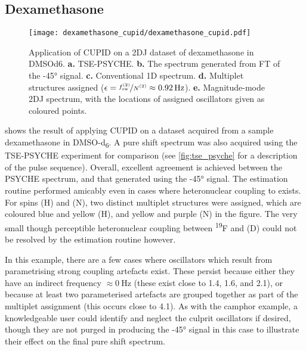 \subsection{Dexamethasone}
\begin{sidewaysfigure}%
    \centering%
    \texttt{[image: dexamethasone\_cupid/dexamethasone\_cupid.pdf]}%
    \caption[
        Application of \acs{CUPID} on a dexamethasone dataset.
    ]{
        Application of \acs{CUPID} on a \ac{2DJ} dataset of dexamethasone in
        \acs{DMSOd6}.
        \textbf{a.} \acs{TSE-PSYCHE}.
        \textbf{b.} The spectrum generated from \ac{FT} of the \ang{-45}
        signal.
        \textbf{c.} Conventional \acs{1D} spectrum.
        \textbf{d.} Multiplet structures assigned ($\epsilon =
        \nicefrac{\fswtwo}{\Ntwo} \approx \qty{0.92}{\hertz}$).
        \textbf{e.} Magnitude-mode \acs{2DJ} spectrum, with the locations of
        assigned oscillators given as coloured points.
    }
    \label{fig:dexamethasone-cupid}%
\end{sidewaysfigure}%

 shows the result of applying CUPID on a
dataset acquired from a sample dexamethasone in DMSO-d\textsubscript{6}. A
pure shift spectrum was also acquired using the
\ac{TSE-PSYCHE} experiment\cite{Foroozandeh2018,Foroozandeh2015} for
comparison (see \cref{fig:tse_psyche} for a description of the pulse sequence).
Overall, excellent agreement is achieved between the \ac{PSYCHE}
spectrum, and that generated using the \ang{-45} signal. The estimation routine
performed amicably even in cases where heteronuclear coupling to
 exists. For spins (H) and (N), two distinct
multiplet structures were assigned, which are coloured blue and yellow (H), and
yellow and purple (N) in the figure. The very small though perceptible
heteronuclear coupling between \textsuperscript{19}F and (D) could not be
resolved by the estimation routine however.

In this example, there are a few cases where oscillators which result from
parametrising strong coupling artefacts exist. These persist because
either they have an indirect frequency $\approx \qty{0}{\hertz}$ (these exist close to
\qty{1.4}{\partspermillion}, \qty{1.6}{\partspermillion}, and
\qty{2.1}{\partspermillion}), or because at
least two parameterised artefacts are grouped together as part of the multiplet
assignment (this occurs close to \qty{4.1}{\partspermillion}). As with the
camphor example, a knowledgeable user could identify and neglect the culprit
oscillators if desired, though they are not purged in producing the \ang{-45}
signal in this case to illustrate their effect on the final pure shift spectrum.

